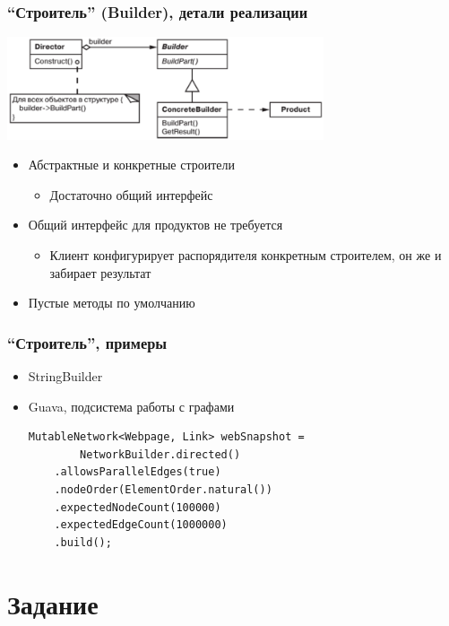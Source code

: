 \documentclass{../../slides-style}
\begin{document}
    \begin{frame}
        \frametitle{``Строитель'' (Builder), детали реализации}
        \begin{center}
            \includegraphics[width=0.7\textwidth]{builder.png}
        \end{center}
        \begin{itemize}
            \item Абстрактные и конкретные строители
            \begin{itemize}
                \item Достаточно общий интерфейс
            \end{itemize}
            \item Общий интерфейс для продуктов не требуется
            \begin{itemize}
                \item Клиент конфигурирует распорядителя конкретным строителем, он же и забирает результат
            \end{itemize}
            \item Пустые методы по умолчанию
        \end{itemize}
    \end{frame}

    \begin{frame}[fragile]
        \frametitle{``Строитель'', примеры}
        \begin{itemize}
            \item StringBuilder
            \item Guava, подсистема работы с графами
            \begin{verbatim}
MutableNetwork<Webpage, Link> webSnapshot = 
        NetworkBuilder.directed()
    .allowsParallelEdges(true)
    .nodeOrder(ElementOrder.natural())
    .expectedNodeCount(100000)
    .expectedEdgeCount(1000000)
    .build();
            \end{verbatim}
        \end{itemize}
    \end{frame}

    \section{Задание}
\end{document}
